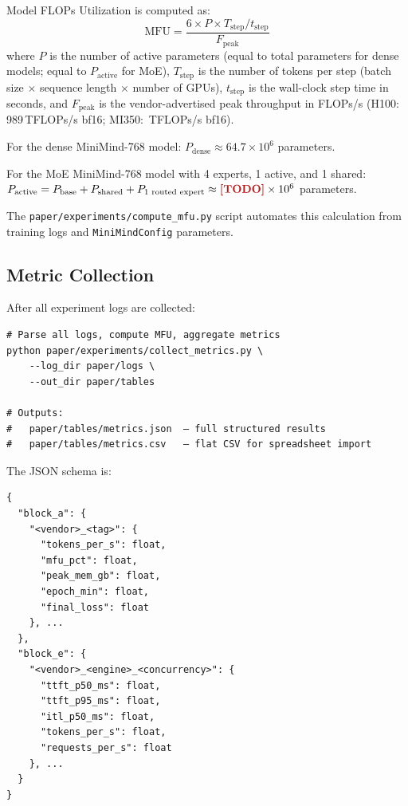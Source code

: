 Model FLOPs Utilization is computed as:
\[
  \text{MFU} = \frac{6 \times P \times T_{\text{step}} / t_{\text{step}}}%
                    {F_{\text{peak}}}
\]
where $P$ is the number of active parameters (equal to total parameters for
dense models; equal to $P_{\text{active}}$ for MoE), $T_{\text{step}}$ is
the number of tokens per step (batch size $\times$ sequence length $\times$
number of GPUs), $t_{\text{step}}$ is the wall-clock step time in seconds,
and $F_{\text{peak}}$ is the vendor-advertised peak throughput in FLOPs/s
(H100: 989\,TFLOPs/s bf16; MI350: \PH{}\,TFLOPs/s bf16).

For the dense MiniMind-768 model:
$P_{\text{dense}} \approx 64.7\times10^6$ parameters.

For the MoE MiniMind-768 model with 4 experts, 1 active, and 1 shared:
$P_{\text{active}} = P_{\text{base}} + P_{\text{shared}} + P_{\text{1 routed expert}}
\approx \PH{}\times10^6$ parameters.

The \texttt{paper/experiments/compute\_mfu.py} script automates this
calculation from training logs and \texttt{MiniMindConfig} parameters.

\subsection{Metric Collection}
\label{sec:appendix:metrics}

After all experiment logs are collected:

\begin{verbatim}
# Parse all logs, compute MFU, aggregate metrics
python paper/experiments/collect_metrics.py \
    --log_dir paper/logs \
    --out_dir paper/tables

# Outputs:
#   paper/tables/metrics.json  — full structured results
#   paper/tables/metrics.csv   — flat CSV for spreadsheet import
\end{verbatim}

The JSON schema is:

\begin{verbatim}
{
  "block_a": {
    "<vendor>_<tag>": {
      "tokens_per_s": float,
      "mfu_pct": float,
      "peak_mem_gb": float,
      "epoch_min": float,
      "final_loss": float
    }, ...
  },
  "block_e": {
    "<vendor>_<engine>_<concurrency>": {
      "ttft_p50_ms": float,
      "ttft_p95_ms": float,
      "itl_p50_ms": float,
      "tokens_per_s": float,
      "requests_per_s": float
    }, ...
  }
}
\end{verbatim}
